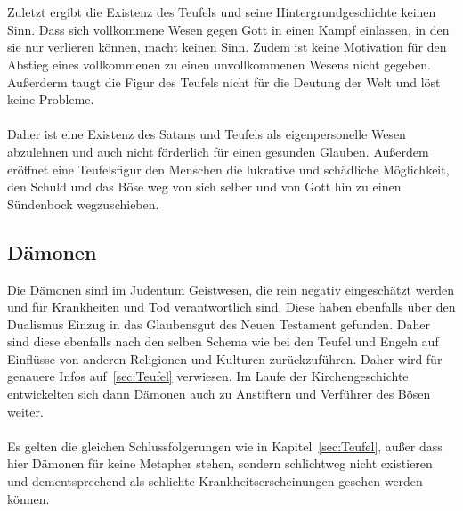 \\~\\
Zuletzt ergibt die Existenz des Teufels und seine Hintergrundgeschichte keinen Sinn. Dass sich vollkommene Wesen gegen Gott in einen Kampf einlassen, in den sie nur verlieren können, macht keinen Sinn. Zudem ist keine Motivation für den Abstieg eines vollkommenen zu einen unvollkommenen Wesens nicht gegeben.
Außerderm taugt die Figur des Teufels nicht für die Deutung der Welt und löst keine Probleme.
\\~\\
Daher ist eine Existenz des Satans und Teufels als eigenpersonelle Wesen abzulehnen und auch nicht förderlich für einen gesunden Glauben. Außerdem eröffnet eine Teufelsfigur den Menschen die lukrative und schädliche Möglichkeit, den Schuld und das Böse weg von sich selber und von Gott hin zu einen Sündenbock wegzuschieben.

\subsection{Dämonen}
Die Dämonen sind im Judentum Geistwesen, die rein negativ eingeschätzt werden und für Krankheiten und Tod verantwortlich sind. Diese haben ebenfalls über den Dualismus Einzug in das Glaubensgut des Neuen Testament gefunden. Daher sind diese ebenfalls nach den selben Schema wie bei den Teufel und Engeln auf Einflüsse von anderen Religionen und Kulturen zurückzuführen. Daher wird für genauere Infos auf\ \ref{sec:Teufel} verwiesen. Im Laufe der Kirchengeschichte entwickelten sich dann Dämonen auch zu Anstiftern und Verführer des Bösen weiter.
\\~\\
Es gelten die gleichen Schlussfolgerungen wie in Kapitel\ \ref{sec:Teufel}, außer dass hier Dämonen für keine Metapher stehen, sondern schlichtweg nicht existieren und dementsprechend als schlichte Krankheitserscheinungen gesehen werden können.

